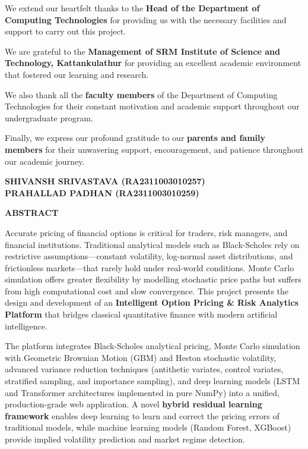 \documentclass[12pt,a4paper]{report}
\begin{document}
We extend our heartfelt thanks to the \textbf{Head of the Department of Computing Technologies} for providing us with the necessary facilities and support to carry out this project.

We are grateful to the \textbf{Management of SRM Institute of Science and Technology, Kattankulathur} for providing an excellent academic environment that fostered our learning and research.

We also thank all the \textbf{faculty members} of the Department of Computing Technologies for their constant motivation and academic support throughout our undergraduate program.

Finally, we express our profound gratitude to our \textbf{parents and family members} for their unwavering support, encouragement, and patience throughout our academic journey.

\vspace{2cm}

\begin{flushright}
\textbf{SHIVANSH SRIVASTAVA (RA2311003010257)}\\
\textbf{PRAHALLAD PADHAN (RA2311003010259)}
\end{flushright}

\newpage
\thispagestyle{empty}
\begin{center}
\textbf{\Large ABSTRACT}
\end{center}

\vspace{1cm}

Accurate pricing of financial options is critical for traders, risk managers, and financial institutions. Traditional analytical models such as Black-Scholes rely on restrictive assumptions---constant volatility, log-normal asset distributions, and frictionless markets---that rarely hold under real-world conditions. Monte Carlo simulation offers greater flexibility by modelling stochastic price paths but suffers from high computational cost and slow convergence. This project presents the design and development of an \textbf{Intelligent Option Pricing \& Risk Analytics Platform} that bridges classical quantitative finance with modern artificial intelligence.

The platform integrates Black-Scholes analytical pricing, Monte Carlo simulation with Geometric Brownian Motion (GBM) and Heston stochastic volatility, advanced variance reduction techniques (antithetic variates, control variates, stratified sampling, and importance sampling), and deep learning models (LSTM and Transformer architectures implemented in pure NumPy) into a unified, production-grade web application. A novel \textbf{hybrid residual learning framework} enables deep learning to learn and correct the pricing errors of traditional models, while machine learning models (Random Forest, XGBoost) provide implied volatility prediction and market regime detection.
\end{document}
